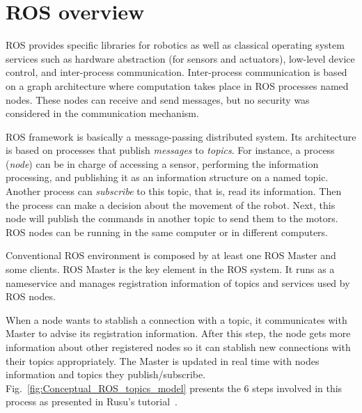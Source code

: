 \documentclass[journal,twoside]{JoPhA}
\begin{document}



\section{ROS overview}
\label{ROS_overview}
ROS provides specific libraries for robotics as well as classical operating system services such as hardware abstraction (for sensors and actuators), low-level device control, and inter-process communication. Inter-process communication is based on a graph architecture where computation takes place in ROS processes named nodes. These nodes can receive and send messages, but no security was considered in the communication mechanism.

ROS framework is basically a message-passing distributed system. Its architecture is based on processes that publish {\em messages} to {\em topics}. For instance, a process ({\em node}) can be in charge of accessing a sensor, performing the information processing, and publishing it as an information structure on a named topic. Another process can {\em subscribe} to this topic, that is, read its information. Then the process can make a decision about the movement of the robot. Next, this node will publish the commands in another topic to send them to the motors. ROS nodes can be running in the same computer or in different computers.

Conventional ROS environment is composed by at least one ROS Master and some clients. ROS Master is the key element in the ROS system. It runs as a nameservice and manages registration information of topics and services used by ROS nodes. 

When a node wants to stablish a connection with a topic, it communicates with Master to advise its registration information. After this step, the node gets more information about other registered nodes so it can stablish new connections with their topics appropriately. The Master is updated in real time with nodes information and topics they publish/subscribe. Fig.~\ref{fig:Conceptual_ROS_topics_model} presents the 6 steps involved in this process as presented in Rusu's tutorial~\cite{rusu2010ros}.
\end{document}
